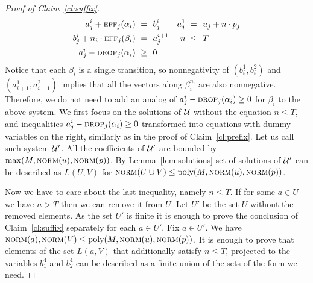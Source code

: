 \begin{appendixproof}
\begin{proof}[Proof of Claim~\ref{cl:suffix}]
\begin{align*}
a^{i}_j + \eff_j(\alpha_i) \ = \ & \ b^{i}_j  & a^1_j \ = \ & \ u_j + n \cdot p_j \\
b^{i}_j + n_i \cdot \eff_j(\beta_i) \ = \ & \ a^{i+1}_j & n \ \leq \ & \ T \label{eq:LPS_bound} \\
a^i_j - \drop_j(\alpha_i) \ \geq \ & \ 0 
\end{align*}
Notice that each $\beta_i$ is a single transition, so nonnegativity of $(b_i^1, b_i^2)$ and $(a_{i+1}^1, a_{i+1}^2)$
implies that all the vectors along  $\beta_i^{n_i}$ are also nonnegative. Therefore, we do not need to
add an analog of $a^i_j - \textsc{drop}_j(\alpha_i) \geq 0$ for $\beta_i$ to the above system. We first focus on the solutions of $\mathcal{U}$ without the equation $n \leq T$, 
and inequalities $a^i_j - \textsc{drop}_j(\alpha_i) \geq 0$ transformed into equations with dummy variables on the right, similarly as in the proof of Claim~\ref{cl:prefix}. Let us call such system $\mathcal{U}'$. All the coefficients of $\mathcal{U}'$ are bounded by $\max(M, \textsc{norm}(u), \textsc{norm}(p))$. By Lemma~\ref{lem:solutions} set of solutions of $\mathcal{U}'$ can be described as $L(U, V)$ for $\textsc{norm}(U \cup V) \leq \textup{poly}(M, \textsc{norm}(u), \textsc{norm}(p))$.


Now we have to care about the last inequality, namely $n \leq T$. If for some $a \in U$ we have $n > T$ then we can remove it from $U$. Let $U'$ be the set $U$ without the removed elements.
As the set $U'$ is finite it is enough to prove the conclusion of Claim~\ref{cl:suffix} separately for each $a \in U'$. Fix $a \in U'$.
We have $\textsc{norm}(a), \textsc{norm}(V) \leq \textup{poly}(M, \textsc{norm}(u), \textsc{norm}(p))$.
It is enough to prove that elements of the set $L(a, V)$ that additionally satisfy $n \leq T$, projected to the variables
$b^4_1$ and $b^4_2$ can be described as a finite union of the sets of the form we need.


\end{proof}
\end{appendixproof}
